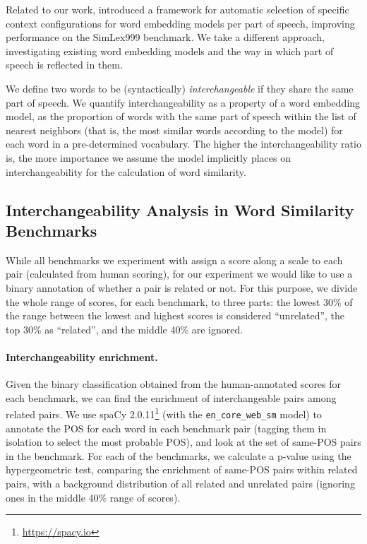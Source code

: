 \documentclass[11pt,a4paper]{article}
\begin{document}
    Related to our work,
     introduced a framework for automatic selection of
    specific context configurations for word embedding models
    per part of speech, improving
    performance on the SimLex999 benchmark.
    We take a different approach, investigating existing word embedding
    models and the way in which part of speech is reflected in them.
    
    We define two words to be (syntactically) \textit{interchangeable}
    if they share the same part of speech.
    We quantify interchangeability
    as a property of a word embedding model,
    as the proportion of words with the same part of speech
    within the list of nearest neighbors
    (that is, the most similar words according to the model)
    for each word in a pre-determined vocabulary.
    The higher the interchangeability ratio is,
    the more importance we assume the model implicitly places on interchangeability
    for the calculation of word similarity.
    
    \subsection{Interchangeability Analysis in Word Similarity Benchmarks}\label{sec:benchmark_exp}
    
    While all benchmarks we experiment with assign a score along a scale to each pair
    (calculated from human scoring), for our experiment we would like to use
    a binary annotation of whether a pair is related or not.
    For this purpose, we divide the whole range of scores,
    for each benchmark, to three parts:
    the lowest 30\% of the range between the lowest and highest scores
    is considered ``unrelated'', the top 30\% as ``related'',
    and the middle 40\% are ignored.
    
    \paragraph{Interchangeability enrichment.}
    
    Given the binary classification obtained from the human-annotated scores
    for each benchmark, we can find the enrichment of interchangeable pairs among
    related pairs.
    We use spaCy 2.0.11\footnote{\url{https://spacy.io}} (with the \texttt{en\_core\_web\_sm} model)
    to annotate the POS for each word in each benchmark
    pair (tagging them in isolation to select the most probable POS),
    and look at the set of same-POS pairs in the benchmark.
    For each of the benchmarks, we calculate a p-value using the hypergeometric
    test, comparing the enrichment of same-POS pairs within related pairs,
    with a background distribution of all related and unrelated pairs (ignoring ones in
    the middle 40\% range of scores).
    
\end{document}
